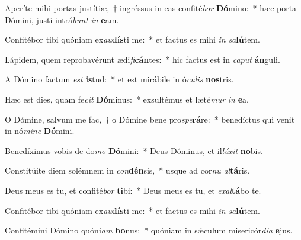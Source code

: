 \item Aperíte mihi portas justítiæ,~† ingréssus in eas confité\textit{bor} \textbf{Dó}mino:~* hæc porta Dómini, justi intrá\textit{bunt} \textit{in} \textbf{e}am.
\item Confitébor tibi quóniam ex\textit{au}\textbf{dís}ti me:~* et factus es mihi \textit{in} \textit{sa}\textbf{lú}tem.
\item Lápidem, quem reprobavérunt ædi\textit{fi}\textbf{cán}tes:~* hic factus est in \textit{ca}\textit{put} \textbf{án}guli.
\item A Dómino factum \textit{est} \textbf{is}tud:~* et est mirábile in ó\textit{cu}\textit{lis} \textbf{nos}tris.
\item Hæc est dies, quam fe\textit{cit} \textbf{Dó}minus:~* exsultémus et læté\textit{mur} \textit{in} \textbf{e}a.
\item O Dómine, salvum me fac,~† o Dómine bene pro\textit{spe}\textbf{rá}re:~* benedíctus qui venit in nó\textit{mi}\textit{ne} \textbf{Dó}mini.
\item Benedíximus vobis de do\textit{mo} \textbf{Dó}mini:~* Deus Dóminus, et il\textit{lú}\textit{xit} \textbf{no}bis.
\item Constitúite diem solémnem in \textit{con}\textbf{dén}sis,~* usque ad cor\textit{nu} \textit{al}\textbf{tá}ris.
\item Deus meus es tu, et confité\textit{bor} \textbf{ti}bi:~* Deus meus es tu, et \textit{ex}\textit{al}\textbf{tá}bo te.
\item Confitébor tibi quóniam ex\textit{au}\textbf{dís}ti me:~* et factus es mihi \textit{in} \textit{sa}\textbf{lú}tem.
\item Confitémini Dómino quóni\textit{am} \textbf{bo}nus:~* quóniam in sǽculum misericór\textit{di}\textit{a} \textbf{e}jus.
